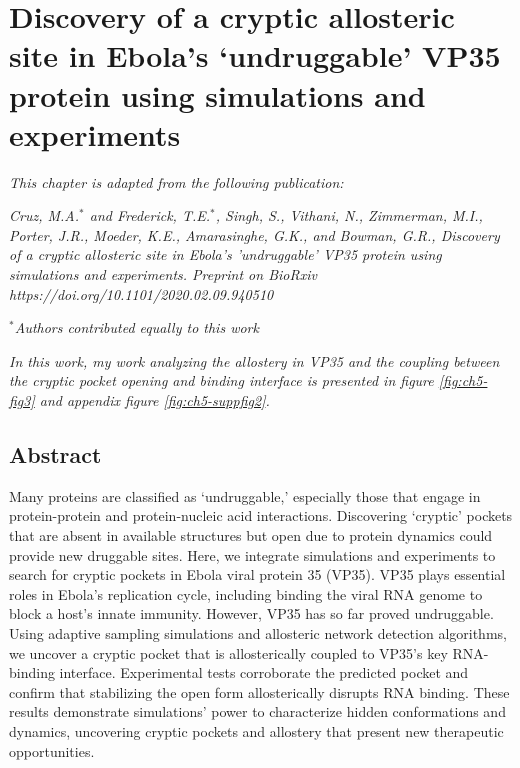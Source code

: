 \documentclass[../main.tex]{subfiles}
\begin{document}
	
    \chapter{Discovery of a cryptic allosteric site in Ebola’s ‘undruggable’ VP35 protein using simulations and experiments}
    \graphicspath{{Chapter5/}}
    \label{ch:vp35pocket}
    \captionsetup{labelfont=bf}
	
    \textit{This chapter is adapted from the following publication:}

    \textit{Cruz, M.A.$^*$ and Frederick, T.E.$^*$, Singh, S., Vithani, N., Zimmerman, M.I., Porter, J.R., Moeder, K.E., Amarasinghe, G.K., and Bowman, G.R., Discovery of a cryptic allosteric site in Ebola's 'undruggable' VP35 protein using simulations and experiments. Preprint on BioRxiv https://doi.org/10.1101/2020.02.09.940510}\cite{Cruz2020vp35}

    \textit{$^*$Authors contributed equally to this work}

    \textit{In this work, my work analyzing the allostery in VP35 and the coupling between the cryptic pocket opening and binding interface is presented in figure \ref{fig:ch5-fig3} and appendix figure \ref{fig:ch5-suppfig2}.}

\section{Abstract}
    Many proteins are classified as ‘undruggable,’ especially those that engage in protein-protein and protein-nucleic acid interactions. Discovering ‘cryptic’ pockets that are absent in available structures but open due to protein dynamics could provide new druggable sites. Here, we integrate simulations and experiments to search for cryptic pockets in Ebola viral protein 35 (VP35). VP35 plays essential roles in Ebola’s replication cycle, including binding the viral RNA genome to block a host’s innate immunity. However, VP35 has so far proved undruggable. Using adaptive sampling simulations and allosteric network detection algorithms, we uncover a cryptic pocket that is allosterically coupled to VP35’s key RNA-binding interface. Experimental tests corroborate the predicted pocket and confirm that stabilizing the open form allosterically disrupts RNA binding. These results demonstrate simulations’ power to characterize hidden conformations and dynamics, uncovering cryptic pockets and allostery that present new therapeutic opportunities.
\end{document}
